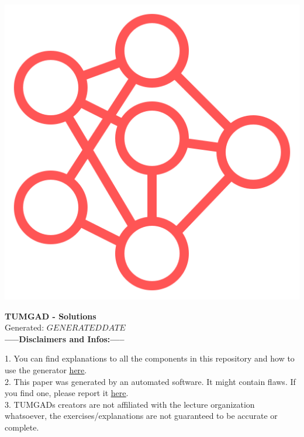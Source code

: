 \documentclass[12pt]{article}
\begin{document}
    \begin{center}
        \includegraphics[scale=0.25]{faviconRed.png} %
        \vspace{15px}

        {\selectfont
            \textbf{\LARGE{TUMGAD - Solutions}}\\
            Generated: $GENERATEDDATE$\\
        }
        \vspace{20px}
        \textbf{\LARGE{-----Disclaimers and Infos:-----}}
        \\[0.2in]
    \end{center}
    1. You can find explanations to all the components in this repository and how to use the generator \href{https://sebastianoner.github.io/TUMGAD/src/routes}{\underline{here}}.
    \\[0.2in]
    2. This paper was generated by an automated software.
    It might contain flaws.
    If you find one, please report it \href{https://github.com/SebastianOner/TUMGAD/issues/new?assignees=&labels=&template=bug_report.md&title=}{\underline{here}}.
    \\[0.2in]
    3. TUMGADs creators are not affiliated with the lecture organization whatsoever, the exercises/explanations are not
    guaranteed to be accurate or complete.
\end{document}
